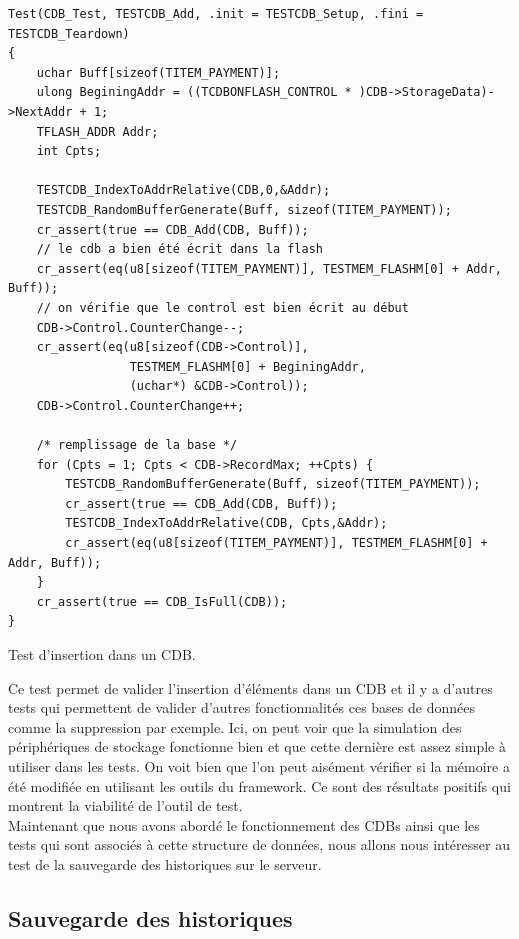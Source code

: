 \documentclass[a4paper]{article}
\begin{document}
\begin{listing}[ht!]
\begin{verbatim}
Test(CDB_Test, TESTCDB_Add, .init = TESTCDB_Setup, .fini = TESTCDB_Teardown)
{
    uchar Buff[sizeof(TITEM_PAYMENT)];
    ulong BeginingAddr = ((TCDBONFLASH_CONTROL * )CDB->StorageData)->NextAddr + 1;
    TFLASH_ADDR Addr;
    int Cpts;

    TESTCDB_IndexToAddrRelative(CDB,0,&Addr);
    TESTCDB_RandomBufferGenerate(Buff, sizeof(TITEM_PAYMENT));
    cr_assert(true == CDB_Add(CDB, Buff));
    // le cdb a bien été écrit dans la flash
    cr_assert(eq(u8[sizeof(TITEM_PAYMENT)], TESTMEM_FLASHM[0] + Addr, Buff));
    // on vérifie que le control est bien écrit au début
    CDB->Control.CounterChange--;
    cr_assert(eq(u8[sizeof(CDB->Control)],
                 TESTMEM_FLASHM[0] + BeginingAddr,
                 (uchar*) &CDB->Control));
    CDB->Control.CounterChange++;

    /* remplissage de la base */
    for (Cpts = 1; Cpts < CDB->RecordMax; ++Cpts) {
        TESTCDB_RandomBufferGenerate(Buff, sizeof(TITEM_PAYMENT));
        cr_assert(true == CDB_Add(CDB, Buff));
        TESTCDB_IndexToAddrRelative(CDB, Cpts,&Addr);
        cr_assert(eq(u8[sizeof(TITEM_PAYMENT)], TESTMEM_FLASHM[0] + Addr, Buff));
    }
    cr_assert(true == CDB_IsFull(CDB));
}
\end{verbatim}
\caption{Test d'insertion dans un CDB.}
\label{extestinsertcdb}
\end{listing}

Ce test permet de valider l'insertion d'éléments dans un CDB et il y a d'autres
tests qui permettent de valider d'autres fonctionnalités ces bases de données
comme la suppression par exemple. Ici, on peut voir que la simulation des
périphériques de stockage fonctionne bien et que cette dernière est assez simple
à utiliser dans les tests. On voit bien que l'on peut aisément vérifier si la
mémoire a été modifiée en utilisant les outils du framework. Ce sont des
résultats positifs qui montrent la viabilité de l'outil de test.\\

Maintenant que nous avons abordé le fonctionnement des CDBs ainsi que les tests
qui sont associés à cette structure de données, nous allons nous intéresser au
test de la sauvegarde des historiques sur le serveur.

\subsection{Sauvegarde des historiques}
\label{savehist}
\end{document}
